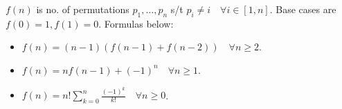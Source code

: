 $f(n)$ is no. of permutations $p_1,\dotsc,p_n$ s/t $p_i \neq i \quad \forall i \in [1, n]$. 
Base cases are $f(0) = 1, f(1) = 0$. Formulas below:

\begin{itemize}
    \item $f(n) = (n - 1)(f(n - 1) + f(n - 2)) \quad \forall n \geq 2$.
    
    \item $f(n) = n f(n - 1) + (-1)^n \quad \forall n \geq 1$.
    
    \item $\displaystyle f(n) = n! \sum^n_{k = 0} \frac{(-1)^k}{k!} \quad \forall n \geq 0$.
\end{itemize}